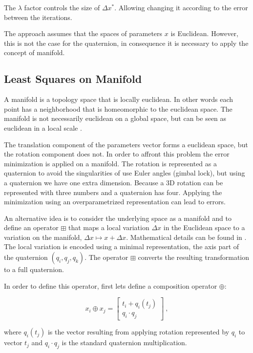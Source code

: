 \noindent The $\lambda$ factor controls the size of $ \Delta x^*$. Allowing changing it according to the error between the iterations.
 
The approach assumes that the spaces of parameters $x$ is Euclidean. However, this is not the case for the quaternion, 
in consequence it is necessary to apply the concept of manifold.


\subsection{Least Squares on Manifold}

A manifold is a topology space that is locally euclidean. In other words each point has a neighborhood that is 
homeomorphic to the euclidean space. The manifold is not necessarily euclidean on a global space, but can be seen 
as euclidean in a local scale \cite{manifold}.

The translation component of the parameters vector forms a euclidean space, but the rotation component does not.
In order to affront this problem the error minimization is applied on a manifold. The rotation is represented as a 
quaternion to avoid the singularities of use Euler angles (gimbal lock), but using a quaternion we have one extra 
dimension. Because a 3D rotation can be represented with three numbers and a quaternion has four. Applying the 
minimization using an overparametrized representation can lead to errors.

An alternative idea is to consider the underlying space as a manifold
and to define an operator $\boxplus$ that maps a local variation
$\Delta x$ in the Euclidean space to a variation on the manifold, $\Delta x \mapsto x + \Delta x$. 
Mathematical details can be found in \cite{hertzberg08}. The local variation is encoded using a minimal 
representation, the axis part of the quaternion $(q_i,q_j,q_k)$. The operator $\boxplus$ converts the 
resulting transformation to a full quaternion.

In order to define this operator, first lets define a composition operator $\oplus$:

$$
x_i \oplus x_j = \begin{bmatrix} t_i + q_i(t_j) \\ q_i \cdot q_j \end{bmatrix} \ ,
$$

\noindent where $q_i(t_j)$ is the vector resulting from applying rotation represented by $q_i$ to vector $t_j$ and 
$q_i \cdot q_j$ is the standard quaternion multiplication.

